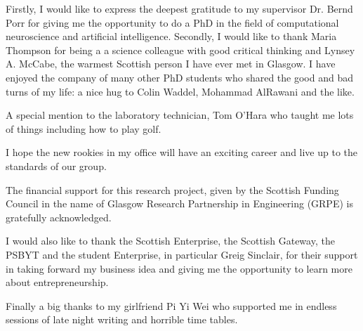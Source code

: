 
Firstly, I would like to express the deepest gratitude to my supervisor
Dr. Bernd Porr for giving me the opportunity to do a PhD in the field
 of computational neuroscience and artificial intelligence.
Secondly, I would like to thank Maria Thompson for being a
a science colleague with good critical thinking and Lynsey A. McCabe, the warmest Scottish
person I have ever met in Glasgow.
I have enjoyed the company of many other PhD students who shared the good and bad turns of
my life: a nice hug to Colin Waddel, Mohammad AlRawani and the like.

A special mention to the laboratory technician, Tom O'Hara who
taught me lots of things including how to play golf.

I hope the new rookies in my office will have an exciting career and live
up to the standards of our group.

The financial support for this research project, given by the Scottish Funding Council
in the name of Glasgow Research Partnership in Engineering (GRPE) is gratefully
acknowledged.

I would also like to thank the Scottish Enterprise, the Scottish Gateway, the PSBYT and
the student Enterprise, in particular Greig Sinclair, for their support in taking
forward my business idea and giving me the opportunity to learn more about
entrepreneurship.

Finally a big thanks to my girlfriend Pi Yi Wei who supported me in endless
sessions of late night writing and horrible time tables.


